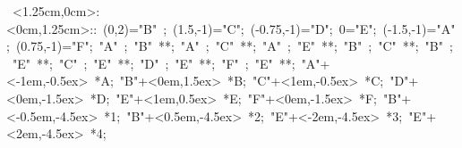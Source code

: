 \hbox{
\xy    <1.25cm,0cm>:<0cm,1.25cm>::
       (0,2)="B" ; (1.5,-1)="C";  (-0.75,-1)="D";   
	   0="E";  (-1.5,-1)="A";    (0.75,-1)="F";
	   "A" ; "B" **\dir{-}; 
       "A" ; "C" **\dir{-}; 
       "A" ; "E" **\dir{-}; 
       "B" ; "C" **\dir{-}; 
       "B" ; "E" **\dir{-}; 
       "C" ; "E" **\dir{-}; 
       "D" ; "E" **\dir{-}; 
       "F" ; "E" **\dir{-}; 
       "A"+<-1em,-0.5ex> *{A};
	   "B"+<0em,1.5ex> *{B};
       "C"+<1em,-0.5ex> *{C};
       "D"+<0em,-1.5ex> *{D};
       "E"+<1em,0.5ex> *{E};
       "F"+<0em,-1.5ex> *{F};
       "B"+<-0.5em,-4.5ex> *{1};
       "B"+<0.5em,-4.5ex> *{2};
       "E"+<-2em,-4.5ex> *{3};
       "E"+<2em,-4.5ex> *{4};
       \endxy}
